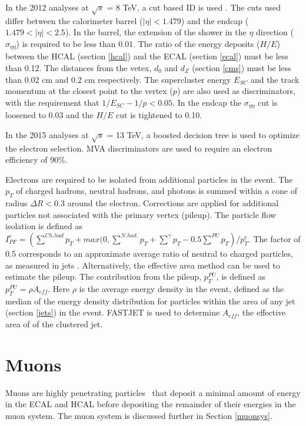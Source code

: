 \documentclass[oneside, letterpaper, oldfontcommands]{memoir}
\begin{document}
\qquad In the 2012 analyses at $\sqrt{s}$ = 8 TeV, a cut based ID is used \cite{Khachatryan:2015hwa}. The cuts used differ between the calorimeter barrel ($|\eta| < 1.479$) and the endcap ($1.479 < |\eta| < 2.5$). In the barrel, the extension of the shower in the $\eta$ direction ($\sigma_{\eta\eta}$) is required to be less than 0.01. The ratio of the energy deposits ($H/E$) between the HCAL (section \ref{hcal}) and the ECAL (section \ref{ecal}) must be less than 0.12.    The distances from the vetex, $d_{0}$ and $d_{Z}$ (section \ref{cms}) must be less than 0.02 cm and 0.2 cm respectively. The supercluster energy $E_{SC}$ and the track momentum at the closest point to the vertex ($p$) are also used as discriminators, with the requirement that $1/E_{SC} - 1/p < 0.05$. In the endcap the $\sigma_{\eta\eta}$ cut is loosened to 0.03 and the $H/E$ cut is tightened to 0.10.

\qquad In the 2015 analyses at $\sqrt{s}$ = 13 TeV, a boosted decision tree is used to optimize the electron selection. MVA discriminators are used to require an electron efficiency of 90\%.

\qquad Electrons are required to be isolated from additional particles in the event. The $p_{T}$ of charged hadrons, neutral hadrons, and photons is summed within a cone of radius $\Delta R < 0.3$ around the electron.  Corrections are applied for additional particles not associated with the primary vertex (pileup). The particle flow isolation is defined as $I_{PF}^{e} = \left(\sum\limits^{Ch. had} p_{T} + max(0, \sum\limits^{N. had.} p_{T} + \sum\limits^{\gamma} p_{T} - 0.5 \sum\limits^{PU} p_{T}\right)/p_{T}^{e}$. The factor of 0.5 corresponds to an approximate average ratio of neutral to charged particles, as measured in jets \cite{CMS-PAS-PFT-10-002}. Alternatively, the effective area method can be used to estimate the pileup. The contribution from the pileup, $p_{T}^{PU}$, is defined as $p_{T}^{PU} = \rho A_{eff}$. Here $\rho$ is the average energy density in the event, defined as the median of the energy density distribution for particles within the area of any jet (section \ref{jets}) in the event.\cite{Khachatryan:2015hwa} FASTJET \cite{Cacciari:2011ma} is used to determine $A_{eff}$, the effective area of of the clustered jet.  


\section{Muons}\label{muons}
\qquad Muons are highly penetrating particles~\cite{Agashe:2014kda} that deposit a minimal amount of energy in the ECAL and HCAL before depositing the remainder of their energies in the muon system. The muon system is discussed further in Section \ref{muonsys}. 
\end{document}

